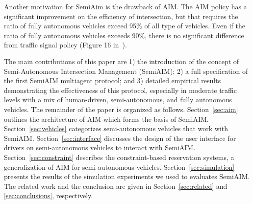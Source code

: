 Another motivation for SemiAim is the drawback of AIM.  The AIM policy
has a significant improvement on the efficiency of intersection, but
that requires the ratio of fully autonomous vehicles exceed 95\% of
all type of vehicles. Even if the ratio of fully autonomous vehicles
exceeds 90\%, there is no significant difference from traffic signal
policy (Figure 16 in~\cite{bib:Dresner08Multiagent}). 

The main contributions of this paper are 1) the introduction of the
concept of Semi-Autonomous Intersection Management (SemiAIM); 2) a
full specification of the first SemiAIM multiagent protocol; and 3)
detailed empirical results demonstrating the effectiveness of this
protocol, especially in moderate traffic levels with a mix of
human-driven, semi-autonomous, and fully autonomous vehicles.  The
remainder of the paper is organized as follows.  Section~\ref{sec:aim}
outlines the architecture of AIM which forms the basis of SemiAIM.
Section~\ref{sec:vehicles} categorizes semi-autonomous vehicles that
work with SemiAIM.  Section~\ref{sec:interface} discusses the design
of the user interface for drivers on semi-autonomous vehicles to
interact with SemiAIM.  Section~\ref{sec:constraint} describes the
constraint-based reservation systems, a generalization of AIM for
semi-autonomous vehicles.  Section~\ref{sec:simulation} presents the
results of the simulation experiments we used to evaluates SemiAIM.
The related work and the conclusion are given in
Section~\ref{sec:related} and \ref{sec:conclusions}, respectively.






